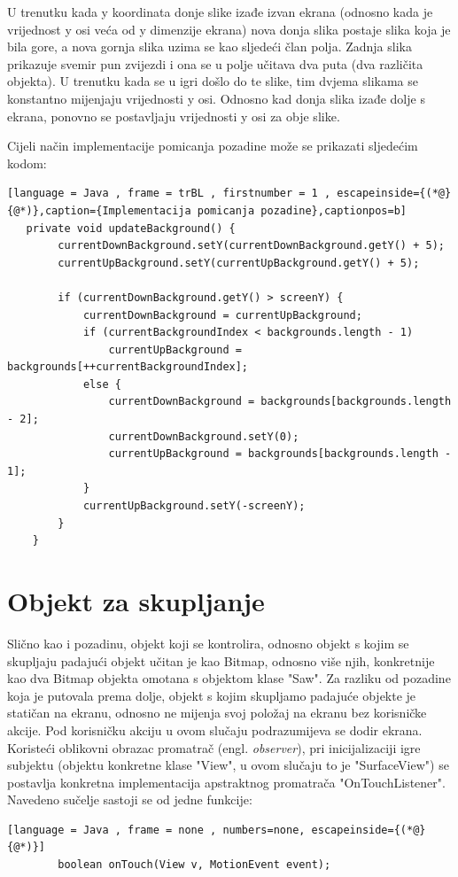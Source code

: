 \documentclass[times, utf8, zavrsni, numeric]{fer}
\begin{document}
	U trenutku kada y koordinata donje slike izađe izvan ekrana (odnosno kada je vrijednost y osi veća od y dimenzije ekrana) nova donja slika postaje slika koja je bila gore, a nova gornja slika uzima se 
	kao sljedeći član polja. 
	Zadnja slika prikazuje svemir pun zvijezdi i ona se u polje učitava dva puta (dva različita objekta). U trenutku kada se u igri došlo do te slike, tim dvjema slikama se konstantno mijenjaju vrijednosti y osi.
	Odnosno kad donja slika izađe dolje s ekrana, ponovno se postavljaju vrijednosti y osi za obje slike. 
	
	
	Cijeli način implementacije \cite{surfaceview2} pomicanja pozadine može se prikazati sljedećim kodom:
	\renewcommand{\lstlistingname}{Kôd}
	\begin{lstlisting}[language = Java , frame = trBL , firstnumber = 1 , escapeinside={(*@}{@*)},caption={Implementacija pomicanja pozadine},captionpos=b]
   private void updateBackground() {
        currentDownBackground.setY(currentDownBackground.getY() + 5);
        currentUpBackground.setY(currentUpBackground.getY() + 5);

        if (currentDownBackground.getY() > screenY) {
            currentDownBackground = currentUpBackground;
            if (currentBackgroundIndex < backgrounds.length - 1)     
                currentUpBackground = backgrounds[++currentBackgroundIndex]; 
            else {
                currentDownBackground = backgrounds[backgrounds.length - 2];
                currentDownBackground.setY(0);
                currentUpBackground = backgrounds[backgrounds.length - 1];
            }
            currentUpBackground.setY(-screenY);
        }
    }
	\end{lstlisting}



	\section{Objekt za skupljanje}
	Slično kao i pozadinu, objekt koji se kontrolira, odnosno objekt s kojim se skupljaju padajući objekt učitan je kao  Bitmap, odnosno više njih, konkretnije kao dva Bitmap objekta omotana s objektom
	klase "Saw". Za razliku od pozadine koja je putovala prema dolje, objekt s kojim skupljamo padajuće objekte je statičan na ekranu, odnosno ne mijenja svoj položaj na ekranu bez korisničke akcije. Pod korisničku akciju u 
	ovom slučaju podrazumijeva se dodir ekrana. Koristeći oblikovni obrazac promatrač (engl. \textit{observer}), pri inicijalizaciji igre  subjektu (objektu konkretne klase "View", u ovom slučaju to je "SurfaceView")
	se postavlja konkretna implementacija apstraktnog promatrača "OnTouchListener". Navedeno sučelje sastoji se od jedne funkcije:
	\begin{lstlisting}[language = Java , frame = none , numbers=none, escapeinside={(*@}{@*)}]
		boolean onTouch(View v, MotionEvent event); 
	\end{lstlisting}
	
\end{document}
